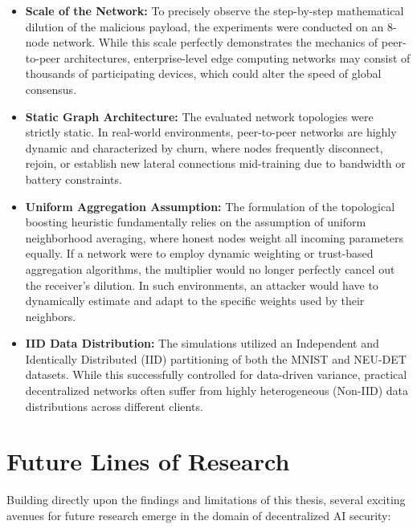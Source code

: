 \begin{itemize}
    \item \textbf{Scale of the Network:} To precisely observe the step-by-step mathematical dilution of the malicious payload, the experiments were conducted on an 8-node network. While this scale perfectly demonstrates the mechanics of peer-to-peer architectures, enterprise-level edge computing networks may consist of thousands of participating devices, which could alter the speed of global consensus.
    \item \textbf{Static Graph Architecture:} The evaluated network topologies were strictly static. In real-world environments, peer-to-peer networks are highly dynamic and characterized by churn, where nodes frequently disconnect, rejoin, or establish new lateral connections mid-training due to bandwidth or battery constraints.
    \item \textbf{Uniform Aggregation Assumption:} The formulation of the topological boosting heuristic fundamentally relies on the assumption of uniform neighborhood averaging, where honest nodes weight all incoming parameters equally. If a network were to employ dynamic weighting or trust-based aggregation algorithms, the multiplier would no longer perfectly cancel out the receiver's dilution. In such environments, an attacker would have to dynamically estimate and adapt to the specific weights used by their neighbors.
    \item \textbf{IID Data Distribution:} The simulations utilized an Independent and Identically Distributed (IID) partitioning of both the MNIST and NEU-DET datasets. While this successfully controlled for data-driven variance, practical decentralized networks often suffer from highly heterogeneous (Non-IID) data distributions across different clients.
\end{itemize}

\section{Future Lines of Research}
Building directly upon the findings and limitations of this thesis, several exciting avenues for future research emerge in the domain of decentralized AI security:

